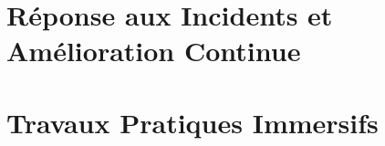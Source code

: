 \documentclass[12pt, a4paper, twoside, openright]{book}
\begin{document}
\part{Réponse aux Incidents et Amélioration Continue}










\part{Travaux Pratiques Immersifs}











\backmatter

\clearpage
\printbibliography[
    heading=bibintoc,
    title={Bibliographie et Références}
]

\clearpage


\clearpage
\end{document}
